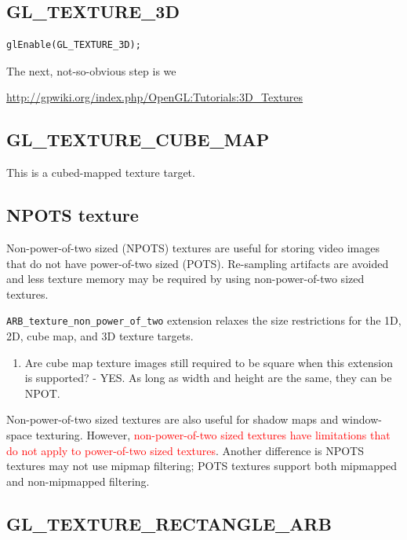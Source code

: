 \subsection{GL\_TEXTURE\_3D}
\label{sec:gl_texture_3d}

\begin{verbatim}
glEnable(GL_TEXTURE_3D);
\end{verbatim}

The next, not-so-obvious step is we 


\url{http://gpwiki.org/index.php/OpenGL:Tutorials:3D_Textures}

\subsection{GL\_TEXTURE\_CUBE\_MAP}
\label{sec:gl_texture_cube_map}

This is a cubed-mapped texture target. 

\subsection{NPOTS texture}
\label{sec:nopts-texture}


Non-power-of-two sized (NPOTS) textures are useful for storing video
images that do not have power-of-two sized (POTS).  Re-sampling
artifacts are avoided and less texture memory may be required by
using non-power-of-two sized textures.  

\verb!ARB_texture_non_power_of_two! extension relaxes the size
restrictions for the 1D, 2D, cube map, and 3D texture targets.
\begin{enumerate}
\item Are cube map texture images still required to be square when this
  extension is supported? - YES. As long as width and height are the
  same, they can be NPOT. 
\end{enumerate}

Non-power-of-two sized textures are also useful for shadow maps and
window-space texturing.  However,
\textcolor{red}{non-power-of-two sized textures have limitations that
  do not apply to power-of-two sized textures}.
Another difference is NPOTS textures may not use mipmap filtering;
POTS textures support both mipmapped and non-mipmapped filtering.

\subsection{GL\_TEXTURE\_RECTANGLE\_ARB}
\label{sec:gl_t}

